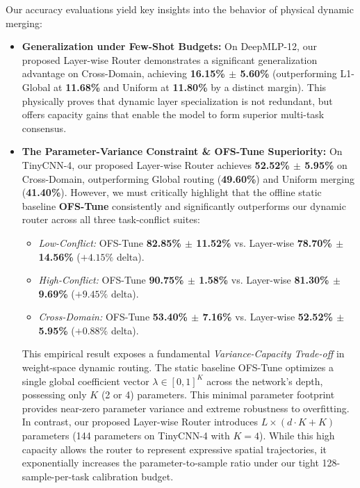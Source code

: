 Our accuracy evaluations yield key insights into the behavior of physical dynamic merging:
\begin{itemize}
    \item \textbf{Generalization under Few-Shot Budgets:} On DeepMLP-12, our proposed Layer-wise Router demonstrates a significant generalization advantage on Cross-Domain, achieving \textbf{16.15\% $\pm$ 5.60\%} (outperforming L1-Global at \textbf{11.68\%} and Uniform at \textbf{11.80\%} by a distinct margin). This physically proves that dynamic layer specialization is not redundant, but offers capacity gains that enable the model to form superior multi-task consensus.
    \item \textbf{The Parameter-Variance Constraint \& OFS-Tune Superiority:} On TinyCNN-4, our proposed Layer-wise Router achieves \textbf{52.52\% $\pm$ 5.95\%} on Cross-Domain, outperforming Global routing (\textbf{49.60\%}) and Uniform merging (\textbf{41.40\%}). However, we must critically highlight that the offline static baseline \textbf{OFS-Tune} consistently and significantly outperforms our dynamic router across all three task-conflict suites:
    \begin{itemize}
        \item \emph{Low-Conflict:} OFS-Tune \textbf{82.85\% $\pm$ 11.52\%} vs. Layer-wise \textbf{78.70\% $\pm$ 14.56\%} ($+4.15\%$ delta).
        \item \emph{High-Conflict:} OFS-Tune \textbf{90.75\% $\pm$ 1.58\%} vs. Layer-wise \textbf{81.30\% $\pm$ 9.69\%} ($+9.45\%$ delta).
        \item \emph{Cross-Domain:} OFS-Tune \textbf{53.40\% $\pm$ 7.16\%} vs. Layer-wise \textbf{52.52\% $\pm$ 5.95\%} ($+0.88\%$ delta).
    \end{itemize}
    This empirical result exposes a fundamental \emph{Variance-Capacity Trade-off} in weight-space dynamic routing. The static baseline OFS-Tune optimizes a single global coefficient vector $\lambda \in [0, 1]^K$ across the network's depth, possessing only $K$ (2 or 4) parameters. This minimal parameter footprint provides near-zero parameter variance and extreme robustness to overfitting. In contrast, our proposed Layer-wise Router introduces $L \times (d \cdot K + K)$ parameters (144 parameters on TinyCNN-4 with $K=4$). While this high capacity allows the router to represent expressive spatial trajectories, it exponentially increases the parameter-to-sample ratio under our tight 128-sample-per-task calibration budget. 
    

\end{itemize}

